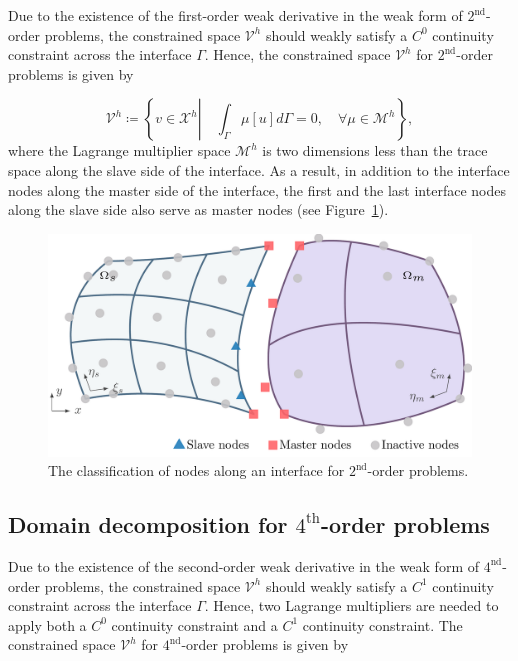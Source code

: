 Due to the existence of the first-order weak derivative in the weak form of $2^\text{nd}$-order problems, the constrained space $\mathcal{V}^h$ should weakly satisfy a $C^0$ continuity constraint across the interface $\Gamma$. Hence, the constrained space $\mathcal{V}^h$ for $2^\text{nd}$-order problems is given by

\begin{equation}
	\mathcal{V}^h\coloneqq \left\{ v\in \mathcal{X}^h \left|\quad \int_{\Gamma} \mu \left[ u \right] d \Gamma=0,\quad \forall \mu\in \mathcal{M}^h \right. \right\},
\end{equation}
where the Lagrange multiplier space $\mathcal{M}^h$ is two dimensions less than the trace space along the slave side of the interface. As a result, in addition to the interface nodes along the master side of the interface, the first and the last interface nodes along the slave side also serve as master nodes (see Figure~\ref{fig:2nd_order_nodes}). 
\begin{figure}[ht]
	\center
	\includegraphics[width=.7\columnwidth]{two_patch_domain_poisson}
	\caption{The classification of nodes along an interface for $2^\text{nd}$-order problems. }\label{fig:2nd_order_nodes}
\end{figure}

\FloatBarrier

\subsection{Domain decomposition for $4^\text{th}$-order problems}

Due to the existence of the second-order weak derivative in the weak form of $4^\text{nd}$-order problems, the constrained space $\mathcal{V}^h$ should weakly satisfy a $C^1$ continuity constraint across the interface $\Gamma$. Hence, two Lagrange multipliers are needed to apply both a $C^0$ continuity constraint and a $C^1$ continuity constraint. The constrained space $\mathcal{V}^h$ for $4^\text{nd}$-order problems is given by

